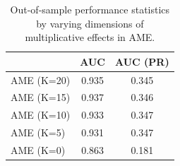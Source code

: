 \begin{table}[ht]
\centering
\begingroup\normalsize
\begin{tabular}{lcc}
  & AUC & AUC (PR) \\ 
  \hline
\hline
AME (K=20) & 0.935 & 0.345 \\ 
   \hline
AME (K=15) & 0.937 & 0.346 \\ 
  AME (K=10) & 0.933 & 0.347 \\ 
  AME (K=5) & 0.931 & 0.347 \\ 
  AME (K=0) & 0.863 & 0.181 \\ 
   \hline
\hline
\end{tabular}
\endgroup
\caption{Out-of-sample performance statistics by varying dimensions of multiplicative effects in AME.} 
\label{tab:ame_vark}
\end{table}
